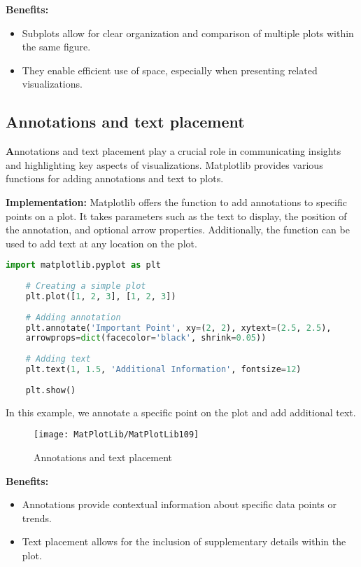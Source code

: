 \textbf{Benefits:}
\begin{itemize}
	\item Subplots allow for clear organization and comparison of multiple plots within the same figure.
	\item They enable efficient use of space, especially when presenting related visualizations.
\end{itemize}

\subsection{Annotations and text placement}

\textbf Annotations and text placement play a crucial role in communicating insights and highlighting key aspects of visualizations. Matplotlib provides various functions for adding annotations and text to plots.

\textbf{Implementation:} Matplotlib offers the  function to add annotations to specific points on a plot. It takes parameters such as the text to display, the position of the annotation, and optional arrow properties. Additionally, the  function can be used to add text at any location on the plot.

\begin{lstlisting}[language=Python]
	import matplotlib.pyplot as plt
	
	# Creating a simple plot
	plt.plot([1, 2, 3], [1, 2, 3])
	
	# Adding annotation
	plt.annotate('Important Point', xy=(2, 2), xytext=(2.5, 2.5),
	arrowprops=dict(facecolor='black', shrink=0.05))
	
	# Adding text
	plt.text(1, 1.5, 'Additional Information', fontsize=12)
	
	plt.show()
\end{lstlisting}

In this example, we annotate a specific point on the plot and add additional text.

\begin{figure}[h]
	\centering
	\texttt{[image: MatPlotLib/MatPlotLib109]}
	\caption{Annotations and text placement}\label{Matplotlib09}
\end{figure}

\textbf{Benefits:}
\begin{itemize}
	\item Annotations provide contextual information about specific data points or trends.
	\item Text placement allows for the inclusion of supplementary details within the plot.
\end{itemize}

